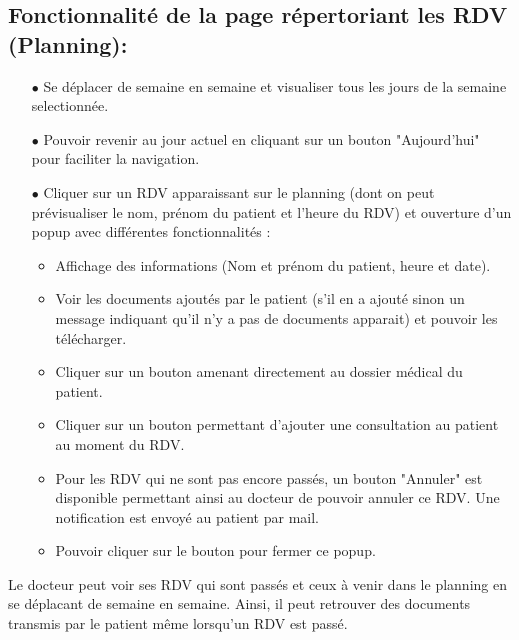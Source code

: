\documentclass[a4paper]{report}
\begin{document}
\subsection{{Fonctionnalité de la page répertoriant les RDV (Planning)}:}\label{planning}
    \begin{itemize}
        \item[$\bullet$] Se déplacer de semaine en semaine et visualiser tous les jours de la semaine selectionnée.
        \item[$\bullet$] Pouvoir revenir au jour actuel en cliquant sur un bouton "Aujourd'hui" pour faciliter la navigation.
        \item[$\bullet$] Cliquer sur un RDV apparaissant sur le planning (dont on peut prévisualiser le nom, prénom du patient et l'heure du RDV) 
        et ouverture d'un popup avec différentes fonctionnalités :
        \begin{itemize}
            \item Affichage des informations (Nom et prénom du patient, heure et date).
            \item Voir les documents ajoutés par le patient (s'il en a ajouté sinon un message indiquant qu'il n'y a pas de documents apparait) et pouvoir les télécharger.
            \item Cliquer sur un bouton amenant directement au dossier médical du patient.
            \item Cliquer sur un bouton permettant d'ajouter une consultation au patient au moment du RDV.
            \item Pour les RDV qui ne sont pas encore passés, un bouton "Annuler" est disponible permettant ainsi au docteur de pouvoir annuler ce RDV. Une notification est envoyé au patient par mail.
            \item Pouvoir cliquer sur le bouton pour fermer ce popup.\newline
        \end{itemize}
    \end{itemize}
    Le docteur peut voir ses RDV qui sont passés et ceux à venir dans le planning en se déplacant de semaine en semaine. Ainsi, il peut retrouver des documents transmis par le patient même lorsqu'un RDV est passé.
    \vspace{3mm}
    
\end{document}
